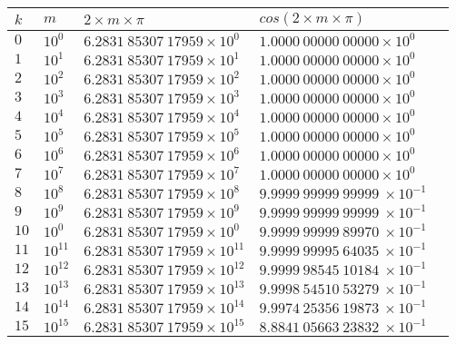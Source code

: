 \documentclass{article}
\begin{document}
\begin{enumerate}
\begin{itemize} [label={}]
	\end{itemize}
\begin{longtable}{|>{\tiny}p{0.1in}|>{\tiny} p{0.2in}| >{\tiny}p{1.2in}|>{\tiny}p{1.2in}|>{\tiny} p{1.0in}}
\hline
$k$&$m$&$2\times m \times \pi$&$cos(2\times m \times \pi)$\\[0.1in]\hline
$0$&$10^{0}$&$6.2831\ 85307 \ 17959\times 10^0 $&$1. 0000 \ 00000 \ 00000 \times 10^{0}$\\[0.1in] \hline
$1$&$10^{1}$&$6.2831\ 85307 \ 17959 \times 10^1 $& $1. 0000 \ 00000 \ 00000 \times 10^{0}$\\[0.1in] \hline
$2$&$10^{2}$&$6.2831\ 85307 \ 17959 \times 10^2 $& $1. 0000 \ 00000 \ 00000 \times 10^{0}$\\[0.1in] \hline
$3$&$10^{3}$&$6.2831 \ 85307 \ 17959 \times 10^3 $& $1. 0000 \ 00000 \ 00000 \times 10^{0}$\\[0.1in] \hline
$4$&$10^{4}$&$6.2831 \ 85307 \ 17959 \times 10^4 $& $1. 0000 \ 00000 \ 00000 \times 10^{0}$\\[0.1in] \hline
$5$&$10^{5}$&$6.2831 \ 85307 \ 17959 \times 10^5 $& $1. 0000 \ 00000 \ 00000 \times 10^{0}$\\[0.1in] \hline
$6$&$10^{6}$&$6.2831 \ 85307 \ 17959 \times 10^6 $& $1. 0000 \ 00000 \ 00000 \times 10^{0}$\\[0.1in] \hline
$7$&$10^{7}$&$6.2831 \ 85307 \ 17959 \times 10^7 $& $1. 0000 \ 00000 \ 00000 \times 10^{0}$\\[0.1in] \hline
$8$&$10^{8}$&$6.2831 \ 85307 \ 17959 \times 10^8 $& $9. 9999 \ 99999 \ 99999 \  \times 10^{-1}$\\[0.1in] \hline
$9$&$10^{9}$&$6.2831 \ 85307 \ 17959 \times 10^9 $& $9. 9999 \ 99999 \ 99999 \  \times 10^{-1}$\\[0.1in] \hline
$10$&$10^{0}$&$6.2831\ 85307 \ 17959\times 10^0 $& $9. 9999 \ 99999 \ 89970 \  \times 10^{-1}$\\[0.1in] \hline
$11$&$10^{11}$&$6.2831\ 85307 \ 17959 \times 10^{11} $&$9.9999 \ 99995 \ 64035 \ \times 10^{-1}  $\\[0.1in] \hline
$12$&$10^{12}$&$6.2831\ 85307\ 17959 \times 10^{12}$& $ 9. 9999 \ 98545 \ 10184  \  \times 10^{-1}$\\[0.1in] \hline
$13$&$10^{13}$&$6.2831 \ 85307 \ 17959 \times 10^{13} $& $9.9998\ 54510 \ 53279 \  \times 10^{-1}$\\[0.1in] \hline
$14$&$10^{14}$&$6.2831 \ 85307 \ 17959 \times 10^{14} $&$9.9974 \ 25356 \ 19873 \   \times 10^{-1}$\\[0.1in] \hline
$15$&$10^{15}$&$6.2831 \ 85307 \ 17959 \times 10^{15} $&$8. 8841 \ 05663\ 2 3832\   \times 10^{-1}$\\[0.1in] \hline

\end{longtable}
\end{enumerate}
\end{document}
